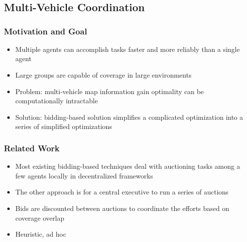 \documentclass[11pt,professionalfonts,hyperref={pdftex,pdfpagemode=none,pdfstartview=FitH}]{beamer}
\begin{document}
\section*{}
\subsection*{Multi-Vehicle Coordination}

\begin{frame}
\frametitle{Motivation and Goal}

\begin{itemize}
	\item Multiple agents can accomplish tasks faster and more reliably than a single agent
	\item Large groups are capable of coverage in large environments
	\item Problem: multi-vehicle map information gain optimality can be computationally intractable
	\item Solution: bidding-based solution simplifies a complicated optimization into a series of simplified optimizations
\end{itemize}

\end{frame}

\begin{frame}
\frametitle{Related Work}

\begin{itemize}
	\item Most existing bidding-based techniques deal with auctioning tasks among a few agents locally in decentralized frameworks
	\item The other approach is for a central executive to run a series of auctions
	\item Bids are discounted between auctions to coordinate the efforts based on coverage overlap
	\item Heuristic, ad hoc
\end{itemize}

\end{frame}
\end{document}
